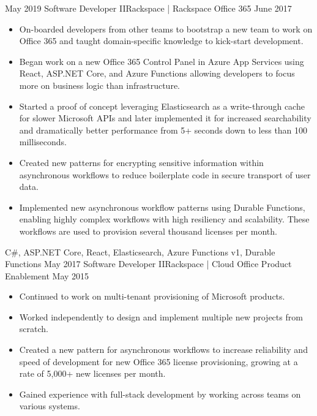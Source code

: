 \begin{experiences}
  \emptySeparator
  \experience
    {May 2019}     {Software Developer II}{Rackspace | Rackspace Office 365}
    {June 2017}    {
                      \begin{itemize}
                        \item On-boarded developers from other teams to bootstrap a new team to work on Office 365 and taught domain-specific knowledge to kick-start development.
                        \item Began work on a new Office 365 Control Panel in Azure App Services using React, ASP.NET Core, and Azure Functions allowing developers to focus more on business logic than infrastructure.
                        \item Started a proof of concept leveraging Elasticsearch as a write-through cache for slower Microsoft APIs and later implemented it for increased searchability and dramatically better performance from 5+ seconds down to less than 100 milliseconds.
                        \item Created new patterns for encrypting sensitive information within asynchronous workflows to reduce boilerplate code in secure transport of user data.
                        \item Implemented new asynchronous workflow patterns using Durable Functions, enabling highly complex workflows with high resiliency and scalability. These workflows are used to provision several thousand licenses per month.
                      \end{itemize}
                    }
                    {C\#, ASP.NET Core, React, Elasticsearch, Azure Functions v1, Durable Functions}
  \emptySeparator
  \experience
    {May 2017}     {Software Developer II}{Rackspace | Cloud Office Product Enablement}
    {May 2015}     {
                      \begin{itemize}
                        \item Continued to work on multi-tenant provisioning of Microsoft products.
                        \item Worked independently to design and implement multiple new projects from scratch.
                        \item Created a new pattern for asynchronous workflows to increase reliability and speed of development for new Office 365 license provisioning, growing at a rate of 5,000+ new licenses per month.
                        \item Gained experience with full-stack development by working across teams on various systems.

\end{itemize}}
\end{experiences}
